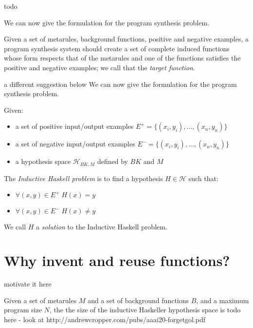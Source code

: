 \ac{todo}
\begin{defn}
\end{defn}


\noindent We can now give the formulation for the program synthesis problem.
\begin{defn}
Given a set of metarules, background functions, positive and negative examples, a program synthesis system should create a set of complete induced functions whose form respects that of the metarules and one of the functions satisfies the positive and negative examples; we call that the \textit{target function}.
\end{defn}


\ac{a different suggestion below}
\noindent We can now give the formulation for the program synthesis problem.
\begin{defn}
Given:

\begin{itemize}
    \item a set of positive input/output examples $E^+ = \{(x_i,y_i),\dots, (x_n,y_n)\}$
    \item a set of negative input/output examples $E^- = \{(x_i,y_i),\dots, (x_n,y_n)\}$
    \item a hypothesis space $\mathcal{H}_{BK,M}$ defined by $BK$ and $M$
\end{itemize}

\noindent
The \emph{Inductive Haskell problem} is to find a hypothesis $H \in \mathcal {H}$ such that:

\begin{itemize}
    \item $\forall (x,y) \in E^+ \; H(x) = y$
    \item $\forall (x,y) \in E^- \; H(x) \neq y$
\end{itemize}

\noindent
We call $H$ a \emph{solution} to the Inductive Haskell problem.
\end{defn}

\section{Why invent and reuse functions?}

\ac{motivate it here}

\begin{defn}
Given a set of metarules $M$ and a set of background functions $B$, and a maximum program size $N$, the the size of the inductive Haskeller hypothesis space is
\ac{todo here - look at http://andrewcropper.com/pubs/aaai20-forgetgol.pdf}
\end{defn}

